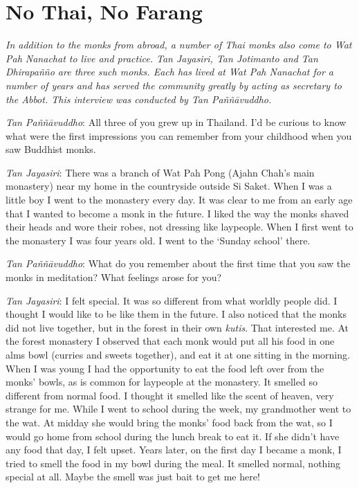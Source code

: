 

\chapter{No Thai, No Farang}
\markright{\chapterAuthor}

\emph{In addition to the monks from abroad, a number of Thai monks also
come to Wat Pah Nanachat to live and practice. Tan Jayasiri, Tan
Jotimanto and Tan Dhirapañño are three such monks. Each has lived at Wat
Pah Nanachat for a number of years and has served the community greatly
by acting as secretary to the Abbot. This interview was conducted by Tan
Paññāvuddho.}

\emph{Tan Paññāvuddho}: All three of you grew up in Thailand. I'd be
curious to know what were the first impressions you can remember from
your childhood when you saw Buddhist monks.

\emph{Tan Jayasiri}: There was a branch of Wat Pah Pong (Ajahn Chah's
main monastery) near my home in the countryside outside Si Saket. When I
was a little boy I went to the monastery every day. It was clear to me
from an early age that I wanted to become a monk in the future. I liked
the way the monks shaved their heads and wore their robes, not dressing
like laypeople. When I first went to the monastery I was four years old.
I went to the `Sunday school' there.

\emph{Tan Paññāvuddho}: What do you remember about the first time that
you saw the monks in meditation? What feelings arose for you?

\emph{Tan Jayasiri}: I felt special. It was so different from what
worldly people did. I thought I would like to be like them in the
future. I also noticed that the monks did not live together, but in the
forest in their own \emph{kutis}. That interested me. At the forest
monastery I observed that each monk would put all his food in one alms
bowl (curries and sweets together), and eat it at one sitting in the
morning. When I was young I had the opportunity to eat the food left
over from the monks' bowls, as is common for laypeople at the monastery.
It smelled so different from normal food. I thought it smelled like the
scent of heaven, very strange for me. While I went to school during the
week, my grandmother went to the wat. At midday she would bring the
monks' food back from the wat, so I would go home from school during the
lunch break to eat it. If she didn't have any food that day, I felt
upset. Years later, on the first day I became a monk, I tried to smell
the food in my bowl during the meal. It smelled normal, nothing special
at all. Maybe the smell was just bait to get me here!

